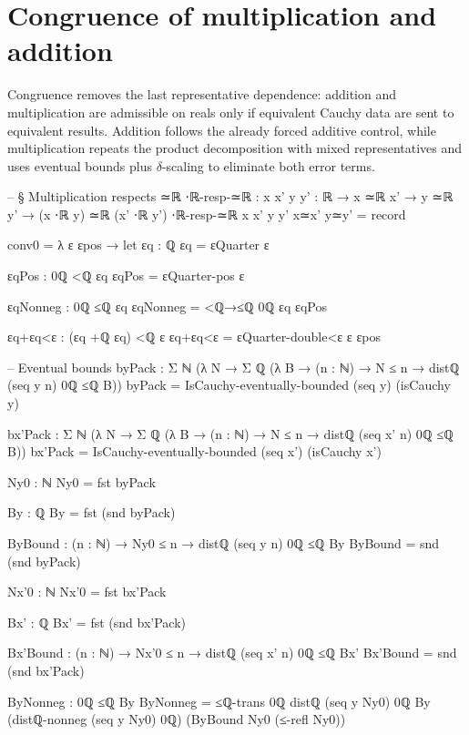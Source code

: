 \documentclass[11pt,a4paper]{book}
\begin{document}
\section{Congruence of multiplication and addition}

Congruence removes the last representative dependence: addition and multiplication are admissible on reals only if equivalent Cauchy data are sent to equivalent results. Addition follows the already forced additive control, while multiplication repeats the product decomposition with mixed representatives and uses eventual bounds plus $\delta$-scaling to eliminate both error terms.

\begin{code}
-- § Multiplication respects ≃ℝ
⋅ℝ-resp-≃ℝ : {x x' y y' : ℝ} → x ≃ℝ x' → y ≃ℝ y' → (x ⋅ℝ y) ≃ℝ (x' ⋅ℝ y')
⋅ℝ-resp-≃ℝ {x} {x'} {y} {y'} x≃x' y≃y' = record
  { conv0 = λ ε εpos →
      let
        εq : ℚ
        εq = εQuarter ε

        εqPos : 0ℚ <ℚ εq
        εqPos = εQuarter-pos ε

        εqNonneg : 0ℚ ≤ℚ εq
        εqNonneg = <ℚ→≤ℚ {0ℚ} {εq} εqPos

        εq+εq<ε : (εq +ℚ εq) <ℚ ε
        εq+εq<ε = εQuarter-double<ε ε εpos

        -- Eventual bounds
        byPack : Σ ℕ (λ N → Σ ℚ (λ B → (n : ℕ) → N ≤ n → distℚ (seq y n) 0ℚ ≤ℚ B))
        byPack = IsCauchy-eventually-bounded (seq y) (isCauchy y)

        bx'Pack : Σ ℕ (λ N → Σ ℚ (λ B → (n : ℕ) → N ≤ n → distℚ (seq x' n) 0ℚ ≤ℚ B))
        bx'Pack = IsCauchy-eventually-bounded (seq x') (isCauchy x')

        Ny0 : ℕ
        Ny0 = fst byPack

        By : ℚ
        By = fst (snd byPack)

        ByBound : (n : ℕ) → Ny0 ≤ n → distℚ (seq y n) 0ℚ ≤ℚ By
        ByBound = snd (snd byPack)

        Nx'0 : ℕ
        Nx'0 = fst bx'Pack

        Bx' : ℚ
        Bx' = fst (snd bx'Pack)

        Bx'Bound : (n : ℕ) → Nx'0 ≤ n → distℚ (seq x' n) 0ℚ ≤ℚ Bx'
        Bx'Bound = snd (snd bx'Pack)

        ByNonneg : 0ℚ ≤ℚ By
        ByNonneg =
          ≤ℚ-trans {0ℚ} {distℚ (seq y Ny0) 0ℚ} {By}
            (distℚ-nonneg (seq y Ny0) 0ℚ)
            (ByBound Ny0 (≤-refl Ny0))

}
\end{code}
\end{document}
